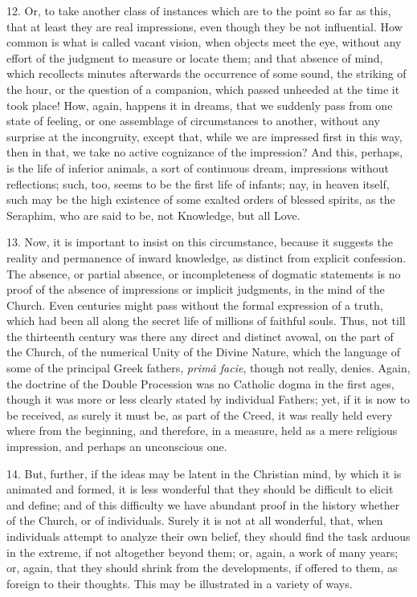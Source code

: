12. Or, to take another class of instances which are to the point
so far as this, that at least they are real impressions, even though
they be not influential. How common is what is called vacant vision,
when objects meet the eye, without any effort of the judgment to
measure or locate them; and that absence of mind, which recollects
minutes afterwards the occurrence of some sound, the striking of the
hour, or the question of a companion, which passed unheeded at the
time it took place! How, again, happens it in dreams, that we suddenly
pass from one state of feeling, or one assemblage of circumstances to
another, without any surprise at the incongruity, except that, while
we are impressed first in this way, then in that, we take no active
cognizance of the impression? And this, perhaps, is the life of
inferior animals, a sort of continuous dream, impressions without
reflections; such, too, seems to be the first life of infants; nay, in
heaven itself, such may be the high existence of some exalted orders
of blessed spirits, as the Seraphim, who are said to be, not
Knowledge, but all Love.

13. Now, it is important to insist on this circumstance, because it
suggests the reality and permanence of inward knowledge, as distinct
from explicit confession. The absence, or partial absence, or
incompleteness of dogmatic statements is no proof of the absence of
impressions or implicit judgments, in the mind of the Church. Even
centuries might pass without the formal expression of a truth, which
had been all along the secret life of millions of faithful souls.
Thus, not till the thirteenth century was there any direct and
distinct avowal, on the part of the Church, of the numerical Unity of
the Divine Nature, which the language of some of the principal Greek
fathers, \emph{primâ facie}, though not really, denies. Again, the
doctrine of the Double Procession was no Catholic dogma in the first
ages, though it was more or less clearly stated by individual Fathers;
yet, if it is now to be received, as surely it must be, as part of the
Creed, it was really held every where from the beginning, and
therefore, in a measure, held as a mere religious impression, and
perhaps an unconscious one.

14. But, further, if the ideas may be latent in the Christian mind,
by which it is animated and formed, it is less wonderful that they
should be difficult to elicit and define; and of this difficulty we
have abundant proof in the history whether of the Church, or of
individuals. Surely it is not at all wonderful, that, when individuals
attempt to analyze their own belief, they should find the task arduous
in the extreme, if not altogether beyond them; or, again, a work of
many years; or, again, that they should shrink from the developments,
if offered to them, as foreign to their thoughts. This may be
illustrated in a variety of ways.

